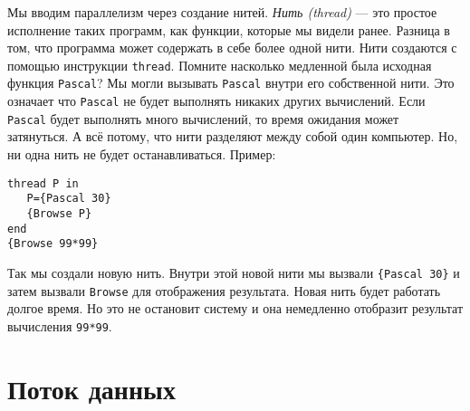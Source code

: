 Мы вводим параллелизм через создание нитей. \emph{Нить (thread)} --- это простое исполнение таких программ, как функции, которые мы видели ранее. Разница в том, что программа может содержать в себе более одной нити. Нити создаются с помощью инструкции \lstinline|thread|. Помните насколько медленной была исходная функция \lstinline|Pascal|? Мы могли вызывать \lstinline|Pascal| внутри его собственной нити. Это означает что \lstinline|Pascal| не будет выполнять никаких других вычислений. Если \lstinline|Pascal| будет выполнять много вычислений, то время ожидания может затянуться. А всё потому, что нити разделяют между собой один компьютер. Но, ни одна нить не будет останавливаться. Пример:

\begin{lstlisting}
thread P in
   P={Pascal 30}
   {Browse P}
end
{Browse 99*99}
\end{lstlisting}

Так мы создали новую нить. Внутри этой новой нити мы вызвали \lstinline|{Pascal 30}| и затем вызвали \lstinline|Browse| для отображения результата. Новая нить будет работать долгое время. Но это не остановит систему и она немедленно отобразит результат вычисления \lstinline|99*99|.

\section{Поток данных}

